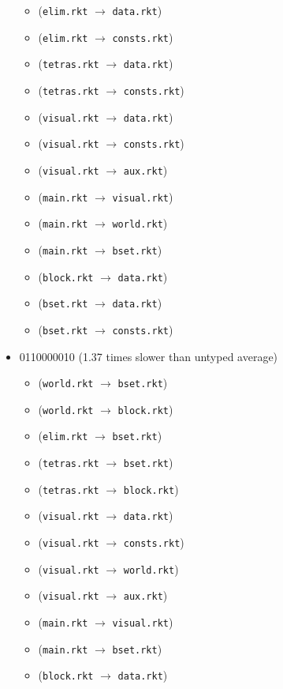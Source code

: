 \documentclass{article}
\newcommand{\mono}[1]{\texttt{#1}}
\begin{document}
\begin{itemize}
\begin{itemize}
  \item (\mono{elim.rkt} $\rightarrow$ \mono{data.rkt})
  \item (\mono{elim.rkt} $\rightarrow$ \mono{consts.rkt})
  \item (\mono{tetras.rkt} $\rightarrow$ \mono{data.rkt})
  \item (\mono{tetras.rkt} $\rightarrow$ \mono{consts.rkt})
  \item (\mono{visual.rkt} $\rightarrow$ \mono{data.rkt})
  \item (\mono{visual.rkt} $\rightarrow$ \mono{consts.rkt})
  \item (\mono{visual.rkt} $\rightarrow$ \mono{aux.rkt})
  \item (\mono{main.rkt} $\rightarrow$ \mono{visual.rkt})
  \item (\mono{main.rkt} $\rightarrow$ \mono{world.rkt})
  \item (\mono{main.rkt} $\rightarrow$ \mono{bset.rkt})
  \item (\mono{block.rkt} $\rightarrow$ \mono{data.rkt})
  \item (\mono{bset.rkt} $\rightarrow$ \mono{data.rkt})
  \item (\mono{bset.rkt} $\rightarrow$ \mono{consts.rkt})
  \end{itemize}
\item 0110000010 (1.37 times slower than untyped average)
  \begin{itemize}
  \item (\mono{world.rkt} $\rightarrow$ \mono{bset.rkt})
  \item (\mono{world.rkt} $\rightarrow$ \mono{block.rkt})
  \item (\mono{elim.rkt} $\rightarrow$ \mono{bset.rkt})
  \item (\mono{tetras.rkt} $\rightarrow$ \mono{bset.rkt})
  \item (\mono{tetras.rkt} $\rightarrow$ \mono{block.rkt})
  \item (\mono{visual.rkt} $\rightarrow$ \mono{data.rkt})
  \item (\mono{visual.rkt} $\rightarrow$ \mono{consts.rkt})
  \item (\mono{visual.rkt} $\rightarrow$ \mono{world.rkt})
  \item (\mono{visual.rkt} $\rightarrow$ \mono{aux.rkt})
  \item (\mono{main.rkt} $\rightarrow$ \mono{visual.rkt})
  \item (\mono{main.rkt} $\rightarrow$ \mono{bset.rkt})
  \item (\mono{block.rkt} $\rightarrow$ \mono{data.rkt})

\end{itemize}
\end{itemize}
\end{document}
